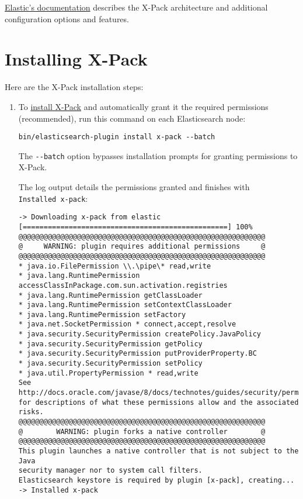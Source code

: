 \href{https://www.elastic.co/guide/en/elasticsearch/reference/6.1/configuring-security.html}{Elastic's
documentation} describes the X-Pack architecture and additional
configuration options and features.

\section{Installing X-Pack}\label{installing-x-pack}

Here are the X-Pack installation steps:

\begin{enumerate}
\def\labelenumi{\arabic{enumi}.}
\item
  To
  \href{https://www.elastic.co/guide/en/elasticsearch/reference/6.1/installing-xpack-es.html}{install
  X-Pack} and automatically grant it the required permissions
  (recommended), run this command on each Elasticsearch node:

\begin{verbatim}
bin/elasticsearch-plugin install x-pack --batch
\end{verbatim}

  The \texttt{-\/-batch} option bypasses installation prompts for
  granting permissions to X-Pack.

  The log output details the permissions granted and finishes with
  \texttt{Installed\ x-pack}:

\begin{verbatim}
-> Downloading x-pack from elastic
[=================================================] 100%   
@@@@@@@@@@@@@@@@@@@@@@@@@@@@@@@@@@@@@@@@@@@@@@@@@@@@@@@@@@@
@     WARNING: plugin requires additional permissions     @
@@@@@@@@@@@@@@@@@@@@@@@@@@@@@@@@@@@@@@@@@@@@@@@@@@@@@@@@@@@
* java.io.FilePermission \\.\pipe\* read,write
* java.lang.RuntimePermission accessClassInPackage.com.sun.activation.registries
* java.lang.RuntimePermission getClassLoader
* java.lang.RuntimePermission setContextClassLoader
* java.lang.RuntimePermission setFactory
* java.net.SocketPermission * connect,accept,resolve
* java.security.SecurityPermission createPolicy.JavaPolicy
* java.security.SecurityPermission getPolicy
* java.security.SecurityPermission putProviderProperty.BC
* java.security.SecurityPermission setPolicy
* java.util.PropertyPermission * read,write
See http://docs.oracle.com/javase/8/docs/technotes/guides/security/permissions.html
for descriptions of what these permissions allow and the associated risks.
@@@@@@@@@@@@@@@@@@@@@@@@@@@@@@@@@@@@@@@@@@@@@@@@@@@@@@@@@@@
@        WARNING: plugin forks a native controller        @
@@@@@@@@@@@@@@@@@@@@@@@@@@@@@@@@@@@@@@@@@@@@@@@@@@@@@@@@@@@
This plugin launches a native controller that is not subject to the Java
security manager nor to system call filters.
Elasticsearch keystore is required by plugin [x-pack], creating...
-> Installed x-pack
\end{verbatim}


\end{enumerate}
